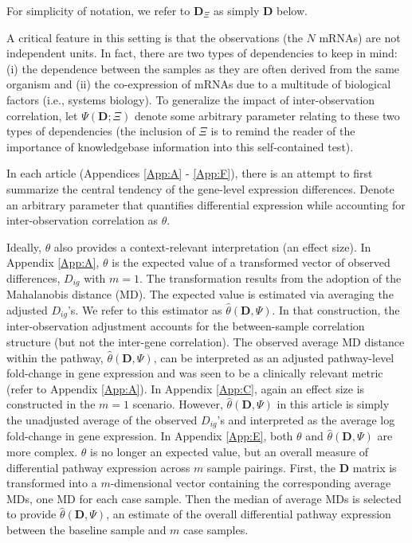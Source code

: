 \noindent \noindent For simplicity of notation, we refer to $\mathbf{D}_{\Xi}$ as simply $\mathbf{D}$ below.

A critical feature in this setting is that the observations (the $N$ mRNAs) are not independent units. In fact, there are two types of dependencies to keep in mind: (i) the dependence between the samples as they are often derived from the same organism and (ii) the co-expression of mRNAs due to a multitude of biological factors (i.e., systems biology). To generalize the impact of inter-observation correlation, let $\Psi(\mathbf{D}; \Xi)$ denote some arbitrary parameter relating to these two types of dependencies (the inclusion of $\Xi$ is to remind the reader of the importance of knowledgebase information into this self-contained test).

In each article (Appendices \ref{App:A} - \ref{App:F}), there is an attempt to first summarize the central tendency of the gene-level expression differences. Denote an arbitrary parameter that quantifies differential expression while accounting for inter-observation correlation as $\theta$.

Ideally, $\theta$ also provides a context-relevant interpretation (an effect size). In Appendix \ref{App:A}, $\theta$ is the expected value of a transformed vector of observed differences, $D_{ig}$ with $m=1$. The transformation results from the adoption of the Mahalanobis distance (MD). The expected value is estimated via averaging the adjusted $D_{ig}$\rq s. We refer to this estimator as $\hat{\theta}(\mathbf{D}, \Psi)$. In that construction, the inter-observation adjustment accounts for the between-sample correlation structure (but not the inter-gene correlation). The observed average MD distance within the pathway, $\hat{\theta}(\mathbf{D}, \Psi)$, can be interpreted as an adjusted pathway-level fold-change in gene expression and was seen to be a clinically relevant metric (refer to Appendix \ref{App:A}). In Appendix \ref{App:C}, again an effect size is constructed in the $m=1$ scenario. However, $\hat{\theta}(\mathbf{D}, \Psi)$ in this article is simply the unadjusted average of the observed $D_{ig}$\rq s and interpreted as the average log fold-change in gene expression. In Appendix \ref{App:E}, both $\theta$ and $\hat{\theta}(\mathbf{D}, \Psi)$ are more complex. $\theta$ is no longer an expected value, but an overall measure of differential pathway expression across $m$ sample pairings. First, the $\mathbf{D}$ matrix is transformed into a $m$-dimensional vector containing the corresponding average MDs, one MD for each case sample. Then the median of average MDs is selected to provide $\hat{\theta}(\mathbf{D}, \Psi)$, an estimate of the overall differential pathway expression between the baseline sample and $m$ case samples.

